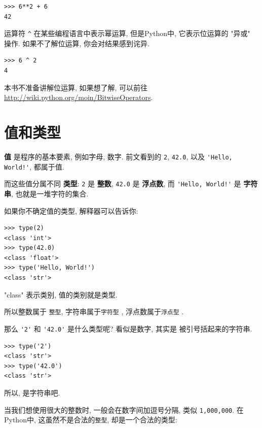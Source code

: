 \documentclass[10pt]{book}
\begin{document}
\begin{verbatim}
>>> 6**2 + 6
42
\end{verbatim}
%

运算符 \verb"^" 在某些编程语言中表示幂运算, 但是Python中, 
它表示位运算的 "异或" 操作. 如果不了解位运算, 你会对结果感到诧异. 

\begin{verbatim}
>>> 6 ^ 2
4
\end{verbatim}
%

本书不准备讲解位运算, 如果想了解, 可以前往 
\url{http://wiki.python.org/moin/BitwiseOperators}. 


\section{值和类型}


 {\bf 值} 是程序的基本要素, 例如字母, 数字. 前文看到的
 {\tt 2}, {\tt 42.0}, 以及 \verb"'Hello, World!'", 都属于值. 

而这些值分属不同 {\bf 类型}:
{\tt 2} 是 {\bf 整数}, 
{\tt 42.0} 是 {\bf 浮点数}, 
而 \verb"'Hello, World!'" 是 {\bf 字符串}, 也就是一堆字符的集合. 

如果你不确定值的类型, 解释器可以告诉你:

\begin{verbatim}
>>> type(2)
<class 'int'>
>>> type(42.0)
<class 'float'>
>>> type('Hello, World!')
<class 'str'>
\end{verbatim}
%

"class" 表示类别, 值的类别就是类型. 


所以整数属于 {\tt 整型}, 字符串属于{\tt 字符型} , 浮点数属于{\tt 浮点型} . 

那么 \verb"'2'" 和 \verb"'42.0'" 是什么类型呢? 看似是数字, 其实是
被引号括起来的字符串. 

\begin{verbatim}
>>> type('2')
<class 'str'>
>>> type('42.0')
<class 'str'>
\end{verbatim}
%
所以, 是字符串吧. 

当我们想使用很大的整数时, 一般会在数字间加逗号分隔, 类似 {\tt 1,000,000}. 
在Python中, 这虽然不是合法的{\tt 整型}, 却是一个合法的类型:
\end{document}
